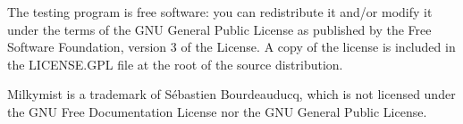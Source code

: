 \documentclass[a4paper,11pt]{article}
\begin{document}
The testing program is free software: you can redistribute it and/or modify it under the terms of the GNU General Public License as published by the Free Software Foundation, version 3 of the License. A copy of the license is included in the LICENSE.GPL file at the root of the source distribution.

Milkymist is a trademark of S\'ebastien Bourdeauducq, which is not licensed under the GNU Free Documentation License nor the GNU General Public License.
\end{document}

